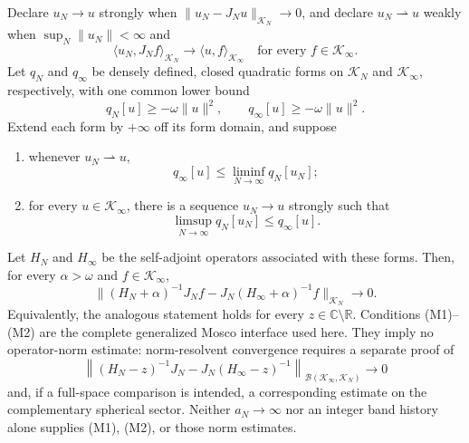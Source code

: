\documentclass[12pt,a4paper]{article}
\begin{document}
\begin{theorem}
Declare \(u_N\to u\) strongly when
\(\lVert u_N-J_Nu\rVert_{\mathcal K_N}\to0\), and declare
\(u_N\rightharpoonup u\) weakly when
\(\sup_N\lVert u_N\rVert<\infty\) and
\[
 \langle u_N,J_Nf\rangle_{\mathcal K_N}
 \longrightarrow
 \langle u,f\rangle_{\mathcal K_\infty}
 \quad\text{for every }f\in\mathcal K_\infty.
\]
Let \(q_N\) and \(q_\infty\) be densely defined, closed quadratic forms on
\(\mathcal K_N\) and \(\mathcal K_\infty\), respectively, with one common
lower bound
\[
 q_N[u]\ge-\omega\lVert u\rVert^2,
 \qquad
 q_\infty[u]\ge-\omega\lVert u\rVert^2.
\]
Extend each form by \(+\infty\) off its form domain, and suppose
\begin{enumerate}[label=(M\arabic*), leftmargin=2.7em]
\item whenever \(u_N\rightharpoonup u\),
\[
 q_\infty[u]\le\liminf_{N\to\infty}q_N[u_N];
\]
\item for every \(u\in\mathcal K_\infty\), there is a sequence
\(u_N\to u\) strongly such that
\[
 \limsup_{N\to\infty}q_N[u_N]\le q_\infty[u].
\]
\end{enumerate}
Let \(H_N\) and \(H_\infty\) be the self-adjoint operators associated with
these forms.  Then, for every \(\alpha>\omega\) and
\(f\in\mathcal K_\infty\),
\begin{equation}
\label{p4:eq:expanding-sphere-strong-resolvent}
 \bigl\lVert
 (H_N+\alpha)^{-1}J_Nf
 -J_N(H_\infty+\alpha)^{-1}f
 \bigr\rVert_{\mathcal K_N}
 \longrightarrow0.
\end{equation}
Equivalently, the analogous statement holds for every
\(z\in\mathbb C\setminus\mathbb R\).  Conditions (M1)--(M2) are the complete
generalized Mosco interface used here.  They imply no operator-norm estimate:
norm-resolvent convergence requires a separate proof of
\[
 \left\lVert
 (H_N-z)^{-1}J_N-J_N(H_\infty-z)^{-1}
 \right\rVert_{\mathcal B(\mathcal K_\infty,\mathcal K_N)}
 \longrightarrow0
\]
and, if a full-space comparison is intended, a corresponding estimate on
the complementary spherical sector.  Neither \(a_N\to\infty\) nor an
integer band history alone supplies (M1), (M2), or those norm estimates.
\end{theorem}
\end{document}

